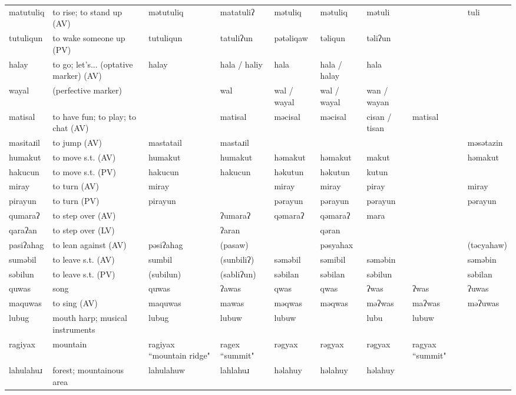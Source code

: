 \begin{landscape}
\begin{longtable}{*{9}{p{}}}
\text{*}matutuliq & to rise; to stand up (AV) & mətutuliq & matatuliʔ & mətuliq & mətuliq & mətuli &  & tuli\\
\text{*}tutuliqun & to wake someone up (PV) & tutuliqun & tatuliʔun & pətəliqaw & təliqun & təliʔun &  & \\
\text{*}halay & to go; let's... (optative marker) (AV) & halay & hala / haliy & hala & hala / halay & hala &  & \\
\text{*}wayal & (perfective marker) &  & wal & wal / wayal & wal / wayal & wan / wayan &  & \\
\text{*}matisal & to have fun; to play; to chat (AV) &  & matisal & məcisal & məcisal & cisan / tisan & matisal & \\
\text{*}masitaɹil & to jump (AV) & mastatail & mastaɹil &  &  &  &  & məsətazin\\
\text{*}humakut & to move s.t. (AV) & humakut & humakut & həmakut & həmakut & makut &  & həmakut\\
\text{*}hakucun & to move s.t. (PV) & hakucun & hakucun & həkutun & həkutun & kutun &  & \\
\text{*}miray & to turn (AV) & miray &  & miray & miray & piray &  & miray\\
\text{*}pirayun & to turn (PV) & pirayun &  & pərayun & pərayun & pərayun &  & pərayun\\
\text{*}qumaraʔ & to step over (AV) &  & ʔumaraʔ & qəmaraʔ & qəmaraʔ & mara &  & \\
\text{*}qaraʔan & to step over (LV) &  & ʔaran &  & qəran &  &  & \\
\text{*}pasiʔahag & to lean against (AV) & pəsiʔahag & (pasaw) &  & pəsyahax &  &  & (təcyahaw)\\
\text{*}suməbil & to leave s.t. (AV) & sumbil & (sunbiliʔ) & səməbil & səmibil & səməbin &  & səməbin\\
\text{*}səbilun & to leave s.t. (PV) & (subilun) & (sabliʔun) & səbilan & səbilan & səbilun &  & səbilan\\
\text{*}quwas & song & quwas & ʔawas & qwas & qwas & ʔwas & ʔwas & ʔuwas\\
\text{*}maquwas & to sing (AV) & maquwas & mawas & məqwas & məqwas & məʔwas & maʔwas & məʔuwas\\
\text{*}lubug & mouth harp; musical instruments & lubug & lubuw & lubuw &  & lubu & lubuw & \\
\text{*}ragiyax & mountain & ragiyax ``mountain ridge" & ragex ``summit" & rəgyax & rəgyax & rəgyax & ragyax ``summit" & \\
\text{*}lahulahuɹ & forest; mountainous area & lahulahuw & lahlahuɹ & həlahuy & həlahuy & həlahuy &  & \\

\end{longtable}
\end{landscape}
